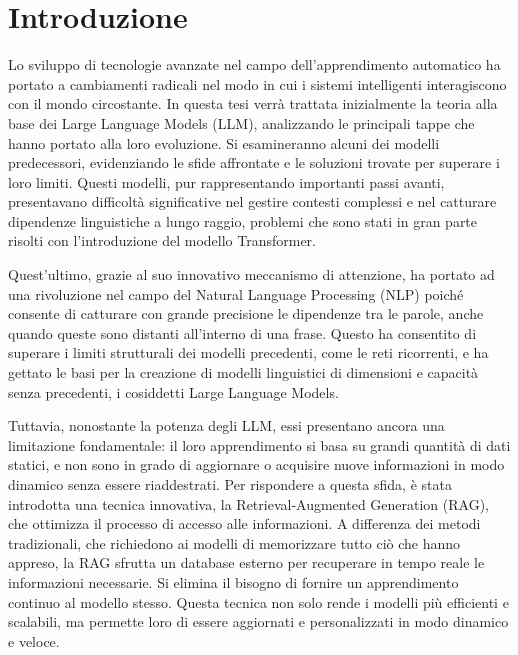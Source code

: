\chapter*{Introduzione}
Lo sviluppo di tecnologie avanzate nel campo dell'apprendimento automatico ha portato a cambiamenti radicali nel modo in cui i sistemi intelligenti interagiscono con il mondo circostante. In questa tesi verrà trattata inizialmente la teoria alla base dei Large Language Models (LLM), analizzando le principali tappe che hanno portato alla loro evoluzione. Si esamineranno alcuni dei modelli predecessori, evidenziando le sfide affrontate e le soluzioni trovate per superare i loro limiti. Questi modelli, pur rappresentando importanti passi avanti, presentavano difficoltà significative nel gestire contesti complessi e nel catturare dipendenze linguistiche a lungo raggio, problemi che sono stati in gran parte risolti con l'introduzione del modello Transformer.

Quest'ultimo, grazie al suo innovativo meccanismo di attenzione, ha portato ad una rivoluzione nel campo del Natural Language Processing (NLP) poiché consente di catturare con grande precisione le dipendenze tra le parole, anche quando queste sono distanti all'interno di una frase. Questo ha consentito di superare i limiti strutturali dei modelli precedenti, come le reti ricorrenti, e ha gettato le basi per la creazione di modelli linguistici di dimensioni e capacità senza precedenti, i cosiddetti Large Language Models.

Tuttavia, nonostante la potenza degli LLM, essi presentano ancora una limitazione fondamentale: il loro apprendimento si basa su grandi quantità di dati statici, e non sono in grado di aggiornare o acquisire nuove informazioni in modo dinamico senza essere riaddestrati. Per rispondere a questa sfida, è stata introdotta una tecnica innovativa, la Retrieval-Augmented Generation (RAG), che ottimizza il processo di accesso alle informazioni. A differenza dei metodi tradizionali, che richiedono ai modelli di memorizzare tutto ciò che hanno appreso, la RAG sfrutta un database esterno per recuperare in tempo reale le informazioni necessarie. Si elimina il bisogno di fornire un apprendimento continuo al modello stesso. Questa tecnica non solo rende i modelli più efficienti e scalabili, ma permette loro di essere aggiornati e personalizzati in modo dinamico e veloce.

